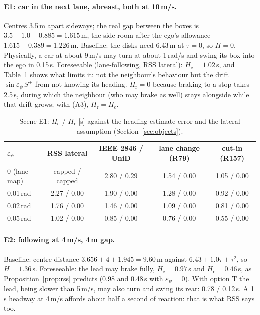 \documentclass[11pt]{article}
\theoremstyle{definition}
\theoremstyle{remark}
\newcommand{\Hc}{H_{\mathrm{c}}}
\newcommand{\Hr}{H_{\mathrm{r}}}
\begin{document}
\paragraph{E1: car in the next lane, abreast, both at 10\,m/s.} Centres 3.5\,m apart sideways; the real
gap between the boxes is $3.5-1.0-0.885=1.615$\,m, the side room after the ego's allowance
$1.615-0.389=1.226$\,m. Baseline: the disks need 6.43\,m at $\tau=0$, so $H=0$. Physically, a car at about
9\,m/s may turn at about 1\,rad/s and swing its box into the ego in 0.15\,s. Foreseeable (lane-following,
RSS lateral): $\Hc=1.02$\,s, and Table~\ref{tab:e1} shows what limits it: not the neighbour's behaviour but
the drift $\sin\varepsilon_\psi\,S^+$ from not knowing its heading. $\Hr=0$ because braking to a stop takes
2.5\,s, during which the neighbour (who may brake as well) stays alongside while that drift grows; with
(A3), $\Hr=\Hc$.

\begin{table}[h]
\centering
\begin{tabular}{lcccc}
\toprule
$\varepsilon_\psi$ & RSS lateral & IEEE 2846 / UniD & lane change (R79) & cut-in (R157) \\
\midrule
0 (lane map) & capped / capped & 2.80 / 0.29 & 1.54 / 0.00 & 1.05 / 0.00 \\
0.01\,rad & 2.27 / 0.00 & 1.90 / 0.00 & 1.28 / 0.00 & 0.92 / 0.00 \\
0.02\,rad & 1.76 / 0.00 & 1.46 / 0.00 & 1.09 / 0.00 & 0.81 / 0.00 \\
0.05\,rad & 1.02 / 0.00 & 0.85 / 0.00 & 0.76 / 0.00 & 0.55 / 0.00 \\
\bottomrule
\end{tabular}
\caption{Scene E1: $\Hc$ / $\Hr$ [s] against the heading-estimate error and the lateral assumption
(Section~\ref{sec:objects}).}
\label{tab:e1}
\end{table}

\paragraph{E2: following at 4\,m/s, 4\,m gap.} Baseline: centre distance $3.656+4+1.945=9.60$\,m against
$6.43+1.0\tau+\tau^2$, so $H=1.36$\,s. Foreseeable: the lead may brake fully, $\Hc=0.97$\,s and $\Hr=0.46$\,s,
as Proposition~\ref{prop:rss} predicts (0.98 and 0.48\,s with $\varepsilon_\psi=0$). With option T the lead,
being slower than 5\,m/s, may also turn and swing its rear: 0.78 / 0.12\,s. A 1\,s headway at 4\,m/s affords
about half a second of reaction: that is what RSS says too.
\end{document}
